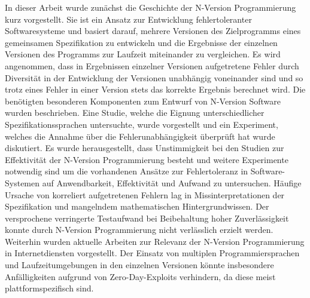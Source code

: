 %
In dieser Arbeit wurde zunächst die Geschichte der N-Version Programmierung kurz vorgestellt.
Sie ist ein Ansatz zur Entwicklung fehlertoleranter Softwaresysteme und basiert darauf, mehrere Versionen des Zielprogramms eines gemeinsamen Spezifikation zu entwickeln und die Ergebnisse der einzelnen Versionen des Programms zur Laufzeit miteinander zu vergleichen.
Es wird angenommen, dass in Ergebnissen einzelner Versionen aufgetretene Fehler durch Diversität in der Entwicklung der Versionen unabhängig voneinander sind und so trotz eines Fehler in einer Version stets das korrekte Ergebnis berechnet wird.
Die benötigten besonderen Komponenten zum Entwurf von N-Version Software wurden beschrieben.
Eine Studie, welche die Eignung unterschiedlicher Spezifikationssprachen untersuchte, wurde vorgestellt und ein Experiment, welches die Annahme über die Fehlerunabhängigkeit überprüft hat wurde diskutiert. Es wurde herausgestellt, dass Unstimmigkeit bei den Studien zur Effektivität der N-Version Programmierung besteht und weitere Experimente notwendig sind um die vorhandenen Ansätze zur Fehlertoleranz in Software-Systemen auf Anwendbarkeit, Effektivität und Aufwand zu untersuchen.
Häufige Ursache von korreliert aufgetretenen Fehlern lag in Missinterpretationen der Spezifikation und mangelndem mathematischen Hintergrundwissen. Der versprochene verringerte Testaufwand bei Beibehaltung hoher Zuverlässigkeit konnte durch N-Version Programmierung nicht verlässlich erzielt werden.
Weiterhin wurden aktuelle Arbeiten zur Relevanz der N-Version Programmierung in Internetdiensten vorgestellt. Der Einsatz von multiplen Programmiersprachen und Laufzeitumgebungen in den einzelnen Versionen könnte insbesondere Anfälligkeiten aufgrund von Zero-Day-Exploits verhindern, da diese meist plattformspezifisch sind.



